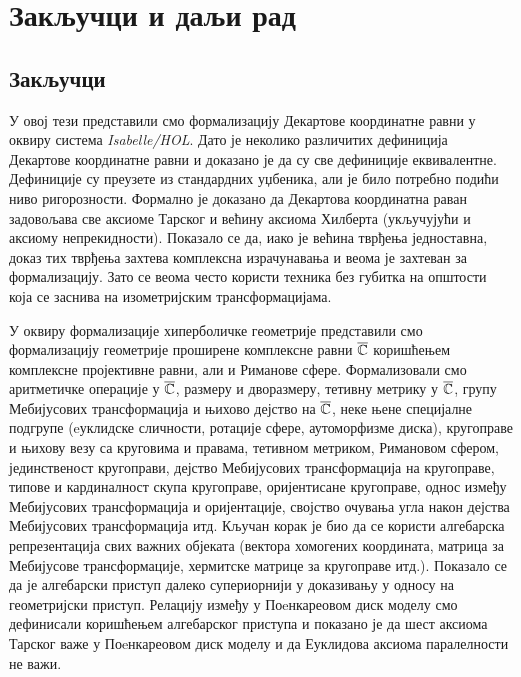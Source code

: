 \chapter{Закључци и даљи рад}
\label{chapter::zakljucak}

\section{Закључци}

У овој тези представили смо формализацију Декартове координатне равни
у оквиру система \emph{Isabelle/HOL}. Дато је неколико различитих
дефиниција Декартове координатне равни и доказано је да су све
дефиниције еквивалентне. Дефиниције су преузете из стандардних
уџбеника, али је било потребно подићи ниво ригорозности. Формално је
доказано да Декартова координатна раван задовољава све аксиоме Тарског
и већину аксиома Хилберта (укључујући и аксиому
непрекидности). Показало се да, иако је већина тврђења једноставна,
доказ тих тврђења захтева комплексна израчунавања и веома је захтеван
за формализацију. Зато се веома често користи техника без губитка на
општости која се заснива на изометријским трансформацијама.

У оквиру формализације хиперболичке геометрије представили смо
формализацију геометрије проширене комплексне равни $\overline{\mathbb{C}}$ коришћењем
комплексне пројективне равни, али и Риманове сфере. Формализовали смо
аритметичке операције у $\overline{\mathbb{C}}$, размеру и дворазмеру, тетивну метрику
у $\overline{\mathbb{C}}$, групу Мебијусових трансформација и њихово дејство на
$\overline{\mathbb{C}}$, неке њене специјалне подгрупе (eуклидске сличности, ротације
сфере, аутоморфизме диска), кругоправе и њихову везу са круговима и
правама, тетивном метриком, Римановом сфером, јединственост
кругоправи, дејство Мебијусових трансформација на кругоправе, типове и
кардиналност скупа кругоправе, оријентисане кругоправе, однос између
Мебијусових трансформација и оријентације, својство очувања угла након
дејства Мебијусових трансформација итд. Кључан корак је био да се
користи алгебарска репрезентација свих важних објеката (вектора
хомогених координата, матрица за Мебијусове трансформације, хермитске
матрице за кругоправе итд.). Показало се да је алгебарски приступ
далеко супериорнији у доказивању у односу на геометријски
приступ. Релацију између у Поeнкареовом диск моделу смо дефинисали
коришћењем алгебарског приступа и показано је да шест аксиома Тарског
важе у Поeнкареовом диск моделу и да Еуклидова аксиома паралелности не
важи.

